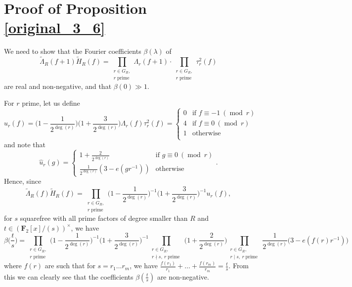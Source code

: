\documentclass[11pt, reqno]{amsart}
\numberwithin{equation}{section}
\newcommand{\zff}{\mathbf{F}_2[x]}
\newcommand{\zffmi}[1]{(\zff/(#1))^{\times}}
\newcommand{\zffmodinvs}{\zffmi{s}}
\newcommand\pprime{\operatorname{prime}}
\newcommand\modd{\operatorname{mod}}
\begin{document}
\section{Proof of Proposition \ref{original_3_6}}
\label{section_3_6}

We need to show that the Fourier coefficients $\beta(\lambda)$ of
$$\widetilde{\Lambda}_R(f+1)\widetilde{H}_R(f) = \prod_{\substack{r \in G_R, \\ r \pprime}} \Lambda_r(f+1) \cdot \prod_{\substack{r \in G_R, \\ r \pprime}} \tau^2_r(f)$$
are real and non-negative, and that $\beta(0) \gg 1$.

For $r$ prime, let us define
\begin{equation}
    u_r(f)=\Big(1-\frac{1}{2^{\deg(r)}}\Big)\Big(1+\frac{3}{2^{\deg(r)}}\Big)\Lambda_r(f) \tau^2_r(f) = \begin{cases}
    0 & \text{if } f \equiv -1 \ (\modd \ r) \\
    4 & \text{if } f \equiv 0 \ (\modd \ r) \\
    1 & \text{otherwise} \\
\end{cases}
\end{equation}
and note that $$\widehat{u}_r(g) = \begin{cases}
    1 + \frac{2}{2^{\deg(r)}} & \text{if } g \equiv 0 \  (\modd \ r) \\
    \frac{1}{2^{\deg(r)}}(3-e(gr^{-1})) & \text{otherwise}
\end{cases}.$$
Hence, since $$\widetilde{\Lambda}_R(f)\widetilde{H}_R(f)=\prod_{\substack{r \in G_R, \\ r \pprime}}\Big(1 - \frac{1}{2^{\deg(r)}}\Big)^{-1}\Big( 1 + \frac{3}{2^{\deg(r)}} \Big)^{-1}u_r(f),$$
for $s$ squarefree with all prime factors of degree smaller than $R$ and $t \in \zffmodinvs$, we have $$\beta\Big(\frac{t}{s}\Big) = \prod_{\substack{r \in G_R, \\ r \pprime}} \Big(1 - \frac{1}{2^{\deg(r)}}\Big)^{-1}\Big( 1 + \frac{3}{2^{\deg(r)}} \Big)^{-1} \prod_{\substack{r \in G_R, \\ r \nmid s, \ r \pprime}} \Big( 1 + \frac{2}{2^{\deg(r)}} \Big) \prod_{\substack{r \in G_R, \\ r \mid s, \ r \pprime}} \frac{1}{2^{\deg(r)}} \big( 3 - e(f(r)r^{-1}) \big)$$
where $f(r)$ are such that for $s=r_1 \dots r_m$, we have $\frac{f(r_1)}{r_1}+ \dots + \frac{f(r_m)}{r_m}=\frac{t}{s}$. From this we can clearly see that the coefficients $\beta(\frac{t}{s})$ are non-negative.
\end{document}
